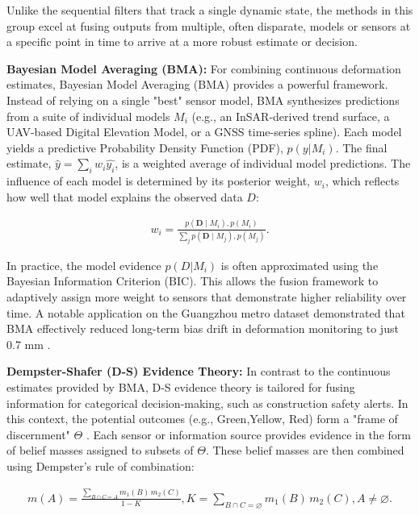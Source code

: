 \documentclass[preprint,11pt,authoryear,3p]{elsarticle}
\begin{document}
Unlike the sequential filters that track a single dynamic state, the methods in this group excel at fusing outputs from multiple, often disparate, models or sensors at a specific point in time to arrive at a more robust estimate or decision.

\textbf{Bayesian Model Averaging (BMA):} For combining continuous deformation estimates, Bayesian Model Averaging (BMA) provides a powerful framework. Instead of relying on a single "best" sensor model, BMA synthesizes predictions from a suite of individual models $M_i$ (e.g., an InSAR-derived trend surface, a UAV-based Digital Elevation Model, or a GNSS time-series spline). Each model yields a predictive Probability Density Function (PDF), $p(y|M_i)$. The final estimate, $\hat{y}=\sum_{i} w_i\hat{y_i}$, is a weighted average of individual model predictions. The influence of each model is determined by its posterior weight, $w_i$, which reflects how well that model explains the observed data $D$:

\begin{align}
w_i=\frac{p(\mathbf{D}\mid M_i),p(M_i)}{\sum_j p(\mathbf{D}\mid M_j),p(M_j)}.
\end{align}

In practice, the model evidence $p(D|M_i)$ is often approximated using the Bayesian Information Criterion (BIC). This allows the fusion framework to adaptively assign more weight to sensors that demonstrate higher reliability over time. A notable application on the Guangzhou metro dataset demonstrated that BMA effectively reduced long-term bias drift in deformation monitoring to just 0.7 mm \citep{Guillermo2024}.

\textbf{Dempster-Shafer (D-S) Evidence Theory:} In contrast to the continuous estimates provided by BMA, D-S evidence theory is tailored for fusing information for categorical decision-making, such as construction safety alerts. In this context, the potential outcomes (e.g., {Green,Yellow, Red}) form a "frame of discernment" $\Theta$ \citep{wu_collapse_2024}. Each sensor or information source provides evidence in the form of belief masses assigned to subsets of $\Theta$. These belief masses are then combined using Dempster's rule of combination:

\begin{align}
m(A)=
\frac{\displaystyle\sum_{B\cap C = A} m_{1}(B)\,m_{2}(C)}
      {1-K},
K=\sum_{B\cap C=\varnothing} m_{1}(B)\,m_{2}(C),
A\neq\varnothing.
\end{align}
\end{document}
